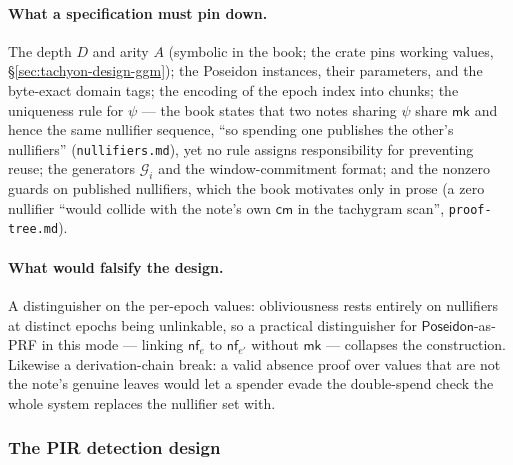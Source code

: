 \documentclass[11pt,a4paper]{article}
\theoremstyle{definition}
\newcommand{\nfsym}{\mathsf{nf}}
\newcommand{\cmsym}{\mathsf{cm}}
\begin{document}
\paragraph{What a specification must pin down.} The depth $D$ and arity $A$
(symbolic in the book; the crate pins working values,
\S\ref{sec:tachyon-design-ggm}); the Poseidon instances,
their parameters, and the byte-exact domain tags; the encoding of the epoch
index into chunks; the uniqueness rule for $\psi$ --- the book states that
two notes sharing $\psi$ share $\mathsf{mk}$ and hence the same nullifier
sequence, ``so spending one publishes the other's nullifiers''
(\texttt{nullifiers.md}), yet no rule assigns responsibility for preventing
reuse; the generators $\mathcal{G}_i$ and the window-commitment format; and
the nonzero guards on published nullifiers, which the book motivates only in
prose (a zero nullifier ``would collide with the note's own $\cmsym$ in the
tachygram scan'', \texttt{proof-tree.md}).

\paragraph{What would falsify the design.} A distinguisher on the per-epoch
values: obliviousness rests entirely on nullifiers at distinct epochs being
unlinkable, so a practical distinguisher for
$\mathsf{Poseidon}$-as-PRF in this mode --- linking $\nfsym_e$ to
$\nfsym_{e'}$ without $\mathsf{mk}$ --- collapses the construction. Likewise
a derivation-chain break: a valid absence proof over values that are not the
note's genuine leaves would let a spender evade the double-spend check the
whole system replaces the nullifier set with.

\subsubsection{The PIR detection design}\label{sec:tachyon-dbu-pir}
\end{document}
